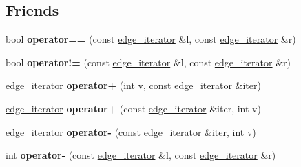 \subsection*{Friends}
\begin{DoxyCompactItemize}
\item 
\hypertarget{classgraph_1_1edge__iterator_a28e0f640c1891ad90508ba99546ec535}{bool {\bfseries operator==} (const \hyperlink{classgraph_1_1edge__iterator}{edge\+\_\+iterator} \&l, const \hyperlink{classgraph_1_1edge__iterator}{edge\+\_\+iterator} \&r)}\label{classgraph_1_1edge__iterator_a28e0f640c1891ad90508ba99546ec535}

\item 
\hypertarget{classgraph_1_1edge__iterator_af3cf38a5594205c4367bbc054c85a507}{bool {\bfseries operator!=} (const \hyperlink{classgraph_1_1edge__iterator}{edge\+\_\+iterator} \&l, const \hyperlink{classgraph_1_1edge__iterator}{edge\+\_\+iterator} \&r)}\label{classgraph_1_1edge__iterator_af3cf38a5594205c4367bbc054c85a507}

\item 
\hypertarget{classgraph_1_1edge__iterator_a4ecd4e3679483eda13d5338fd4353d88}{\hyperlink{classgraph_1_1edge__iterator}{edge\+\_\+iterator} {\bfseries operator+} (int v, const \hyperlink{classgraph_1_1edge__iterator}{edge\+\_\+iterator} \&iter)}\label{classgraph_1_1edge__iterator_a4ecd4e3679483eda13d5338fd4353d88}

\item 
\hypertarget{classgraph_1_1edge__iterator_a5dd36755f0bb84f84588c62aef5e5830}{\hyperlink{classgraph_1_1edge__iterator}{edge\+\_\+iterator} {\bfseries operator+} (const \hyperlink{classgraph_1_1edge__iterator}{edge\+\_\+iterator} \&iter, int v)}\label{classgraph_1_1edge__iterator_a5dd36755f0bb84f84588c62aef5e5830}

\item 
\hypertarget{classgraph_1_1edge__iterator_a98fb2143e8ba5e7a043bd4c87c09814f}{\hyperlink{classgraph_1_1edge__iterator}{edge\+\_\+iterator} {\bfseries operator-\/} (const \hyperlink{classgraph_1_1edge__iterator}{edge\+\_\+iterator} \&iter, int v)}\label{classgraph_1_1edge__iterator_a98fb2143e8ba5e7a043bd4c87c09814f}

\item 
\hypertarget{classgraph_1_1edge__iterator_a85016c8190c146f02194942120d797a2}{int {\bfseries operator-\/} (const \hyperlink{classgraph_1_1edge__iterator}{edge\+\_\+iterator} \&l, const \hyperlink{classgraph_1_1edge__iterator}{edge\+\_\+iterator} \&r)}\label{classgraph_1_1edge__iterator_a85016c8190c146f02194942120d797a2}


\end{DoxyCompactItemize}
